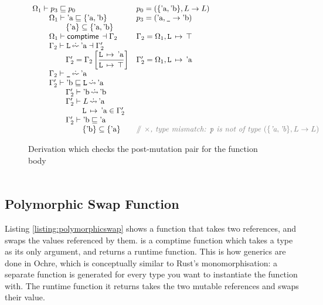 \documentclass[12pt,twoside]{report}
\begin{document}
\begin{figure}
  \[\begin{array}{ll}
    \Omega_1 \vdash p_3 \subtype p_0 &
      p_0 = (\{\atom{a}, \atom{b}\}, L \rightarrow L) \\
    \otab \Omega_1 \vdash \atom{a} \subtype \{\atom{a}, \atom{b}\} &
      p_3 = (\atom{a}, \mono{\_} \rightarrow \atom{b}) \\
    \otab\otab \{\atom{a}\} \subseteq \{\atom{a}, \atom{b}\} \\
    \otab \Omega_1 \vdash \comptime{} \dashv \Gamma_2 &
      \Gamma_2 = \Omega_1,\absmapm{L}{\top} \\
    \otab \Gamma_2 \vdash \mono{L} \erasedwritearrow \atom{a} \dashv \Gamma_2' \\
    \otab\otab \Gamma_2' = \Gamma_2\left[\dfrac{\absmapm{L}{\atom{a}}}{\absmapm{L}{\top}}\right] &
       \Gamma_2' = \Omega_1,\absmapm{L}{\atom{a}} \\
    \otab \Gamma_2 \vdash \mono{\_} \erasedwritearrow \atom{a} \\
    \otab \Gamma_2' \vdash \atom{b} \subtype \mono{L} \erasedreadarrow \atom{a} \\
    \otab\otab \Gamma_2' \vdash \atom{b} \erasedreadarrow \atom{b} \\
    \otab\otab \Gamma_2' \vdash L \erasedreadarrow \atom{a} \\
    \otab\otab\otab \absmapm{L}{\atom{a}} \in \Gamma_2' \\
    \otab\otab \Gamma_2' \vdash \atom{b} \subtype \atom{a} \\
    \otab\otab\otab \{\atom{b}\} \subseteq \{\atom{a}\} &
      \ocomment{$\times$, type mismatch: \mono{p} is not of type $(\{\atom{a}, \atom{b}\}, L \rightarrow L)$} \\
  \end{array}\]
  \caption{Derivation which checks the post-mutation pair for the  function body}
  \label{fig:incorrectpairmutation}
\end{figure}

\begin{adjustwidth}{0cm}{0cm}
\smaller
\[\begin{array}{ll}

\end{array}\]
\end{adjustwidth}

\subsection{Polymorphic Swap Function}
Listing \ref{listing:polymorphicswap} shows a function that takes two references, and swaps the values referenced by them.  is a comptime function which takes a type  as its only argument, and returns a runtime function. This is how generics are done in Ochre, which is conceptually similar to Rust's monomorphisation: a separate function is generated for every type you want to instantiate the function with. The runtime function it returns takes the two mutable references and swaps their value.
\end{document}
